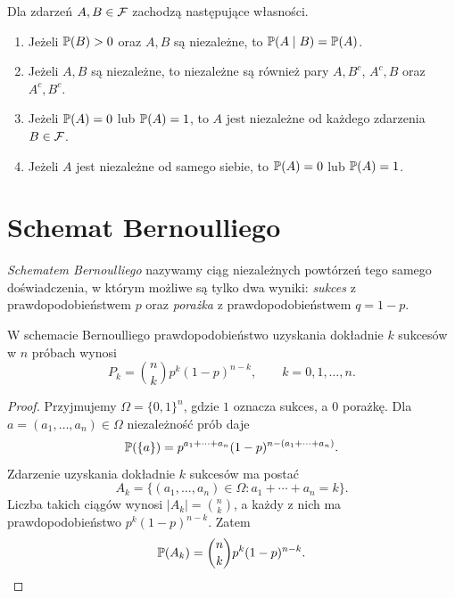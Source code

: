 \begin{fakt}
\label{fakt:wlasnosci-niezaleznosci}
Dla zdarzeń $A,B\in\mathcal{F}$ zachodzą następujące własności.
\begin{enumerate}
  \item Jeżeli $\mathbb{P}(B)>0$ oraz $A,B$ są niezależne, to
    $\mathbb{P}(A\mid B)=\mathbb{P}(A)$.
  \item Jeżeli $A,B$ są niezależne, to niezależne są również pary
    $A,B^c$, $A^c,B$ oraz $A^c,B^c$.
  \item Jeżeli $\mathbb{P}(A)=0$ lub $\mathbb{P}(A)=1$, to $A$ jest niezależne
    od każdego zdarzenia $B\in\mathcal{F}$.
  \item Jeżeli $A$ jest niezależne od samego siebie, to
    $\mathbb{P}(A)=0$ lub $\mathbb{P}(A)=1$.
\end{enumerate}
\end{fakt}

\section{Schemat Bernoulliego}
\label{sec:bernoulli}

\begin{definicja}
\label{def:bernoulli}
\emph{Schematem Bernoulliego} nazywamy ciąg niezależnych powtórzeń
tego samego doświadczenia, w którym możliwe są tylko dwa wyniki:
\emph{sukces} z prawdopodobieństwem $p$ oraz \emph{porażka}
z prawdopodobieństwem $q=1-p$.
\end{definicja}

\begin{fakt}
\label{fakt:bernoulli}
W schemacie Bernoulliego prawdopodobieństwo uzyskania dokładnie $k$
sukcesów w $n$ próbach wynosi
\begin{equation}
  P_k=\binom{n}{k}p^k(1-p)^{n-k},
  \qquad k=0,1,\ldots,n.
  \label{eq:bernoulli}
\end{equation}
\end{fakt}

\begin{proof}
Przyjmujemy $\Omega=\{0,1\}^n$, gdzie $1$ oznacza sukces, a $0$ porażkę.
Dla $a=(a_1,\ldots,a_n)\in\Omega$ niezależność prób daje
\[
  \mathbb{P}(\{a\})=p^{a_1+\cdots+a_n}(1-p)^{n-(a_1+\cdots+a_n)}.
\]
Zdarzenie uzyskania dokładnie $k$ sukcesów ma postać
\[
  A_k=\{(a_1,\ldots,a_n)\in\Omega:a_1+\cdots+a_n=k\}.
\]
Liczba takich ciągów wynosi $|A_k|=\binom nk$, a każdy z nich ma
prawdopodobieństwo $p^k(1-p)^{n-k}$. Zatem
\[
  \mathbb{P}(A_k)=\binom nk p^k(1-p)^{n-k}.
\]
\end{proof}


